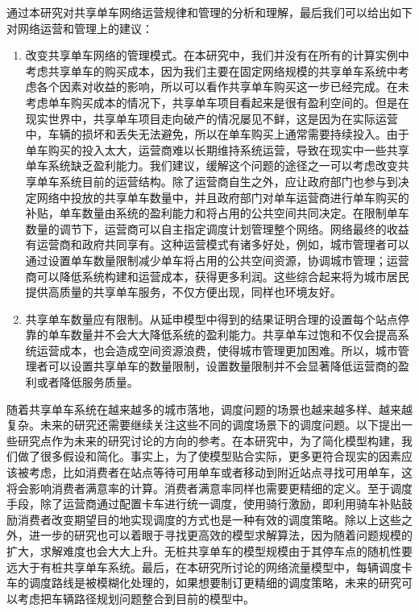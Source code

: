 \documentclass[]{tongjithesis}
\numberwithin{equation}{chapter}
\begin{document}
通过本研究对共享单车网络运营规律和管理的分析和理解，最后我们可以给出如下对网络运营和管理上的建议：
\begin{enumerate}
	\item  改变共享单车网络的管理模式。在本研究中，我们并没有在所有的计算实例中考虑共享单车的购买成本，因为我们主要在固定网络规模的共享单车系统中考虑各个因素对收益的影响，所以可以看作共享单车购买这一步已经完成。在未考虑单车购买成本的情况下，共享单车项目看起来是很有盈利空间的。但是在现实世界中，共享单车项目走向破产的情况屡见不鲜，这是因为在实际运营中，车辆的损坏和丢失无法避免，所以在单车购买上通常需要持续投入。由于单车购买的投入太大，运营商难以长期维持系统运营，导致在现实中一些共享单车系统缺乏盈利能力。我们建议，缓解这个问题的途径之一可以考虑改变共享单车系统目前的运营结构。除了运营商自生之外，应让政府部门也参与到决定网络中投放的共享单车数量中，并且政府部门对单车运营商进行单车购买的补贴，单车数量由系统的盈利能力和将占用的公共空间共同决定。在限制单车数量的调节下，运营商可以自主指定调度计划管理整个网络。网络最终的收益有运营商和政府共同享有。这种运营模式有诸多好处，例如，城市管理者可以通过设置单车数量限制减少单车将占用的公共空间资源，协调城市管理；运营商可以降低系统构建和运营成本，获得更多利润。这些综合起来将为城市居民提供高质量的共享单车服务，不仅方便出现，同样也环境友好。
	\item  共享单车数量应有限制。从延申模型中得到的结果证明合理的设置每个站点停靠的单车数量并不会大大降低系统的盈利能力。共享单车过饱和不仅会提高系统运营成本，也会造成空间资源浪费，使得城市管理更加困难。所以，城市管理者可以设置共享单车的数量限制，设置数量限制并不会显著降低运营商的盈利或者降低服务质量。
\end{enumerate}
随着共享单车系统在越来越多的城市落地，调度问题的场景也越来越多样、越来越复杂。未来的研究还需要继续关注这些不同的调度场景下的调度问题。以下提出一些研究点作为未来的研究讨论的方向的参考。在本研究中，为了简化模型构建，我们做了很多假设和简化。事实上，为了使模型贴合实际，更多更符合现实的因素应该被考虑，比如消费者在站点等待可用单车或者移动到附近站点寻找可用单车，这将会影响消费者满意率的计算。消费者满意率同样也需要更精细的定义。至于调度手段，除了运营商通过配置卡车进行统一调度，使用骑行激励，即利用骑车补贴鼓励消费者改变期望目的地实现调度的方式也是一种有效的调度策略。除以上这些之外，进一步的研究也可以着眼于寻找更高效的模型求解算法，因为随着问题规模的扩大，求解难度也会大大上升。无桩共享单车的模型规模由于其停车点的随机性要远大于有桩共享单车系统。最后，在本研究所讨论的网络流量模型中，每辆调度卡车的调度路线是被模糊化处理的，如果想要制订更精细的调度策略，未来的研究可以考虑把车辆路径规划问题整合到目前的模型中。
\clearpage
\end{document}
